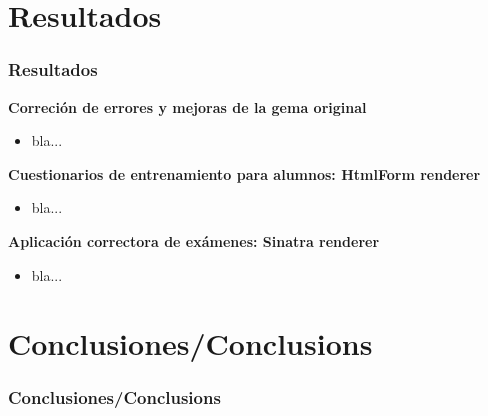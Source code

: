 \documentclass{beamer}
\begin{document}
\section{Resultados}
\begin{frame}[allowframebreaks]
  \frametitle{Resultados}
  
  {\bfseries Correción de errores y mejoras de la gema original}
  \begin{itemize}
    \item bla...
  \end{itemize}
  \framebreak
  
  {\bfseries Cuestionarios de entrenamiento para alumnos: HtmlForm renderer}
  \begin{itemize}
    \item bla...
  \end{itemize}
  \framebreak
  
  {\bfseries Aplicación correctora de exámenes: Sinatra renderer}
  \begin{itemize}
    \item bla...
  \end{itemize}
  \framebreak
\end{frame}

\section{Conclusiones/Conclusions}
\begin{frame}
  \frametitle{Conclusiones/Conclusions}
%   
\end{frame}
\end{document}

